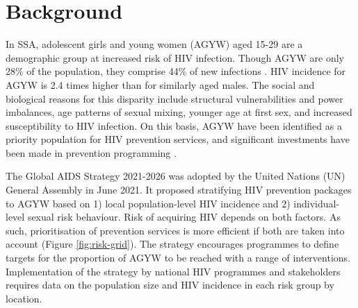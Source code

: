 \documentclass[a4paper, nobind]{templates/ociamthesis}
\begin{document}
\hypertarget{background-2}{%
\section{Background}\label{background-2}}

In SSA, adolescent girls and young women (AGYW) aged 15-29 are a demographic group at increased risk of HIV infection.
Though AGYW are only 28\% of the population, they comprise 44\% of new infections \autocite{unaids2021update}.
HIV incidence for AGYW is 2.4 times higher than for similarly aged males.
The social and biological reasons for this disparity include structural vulnerabilities and power imbalances, age patterns of sexual mixing, younger age at first sex, and increased susceptibility to HIV infection.
On this basis, AGYW have been identified as a priority population for HIV prevention services, and significant investments have been made in prevention programming \autocite{saul2018dreams,global2018measurement}.

The Global AIDS Strategy 2021-2026 \autocite{unaids2021global} was adopted by the United Nations (UN) General Assembly in June 2021.
It proposed stratifying HIV prevention packages to AGYW based on 1) local population-level HIV incidence and 2) individual-level sexual risk behaviour.
Risk of acquiring HIV depends on both factors.
As such, prioritisation of prevention services is more efficient if both are taken into account (Figure \ref{fig:risk-grid}).
The strategy encourages programmes to define targets for the proportion of AGYW to be reached with a range of interventions.
Implementation of the strategy by national HIV programmes and stakeholders requires data on the population size and HIV incidence in each risk group by location.
\end{document}
